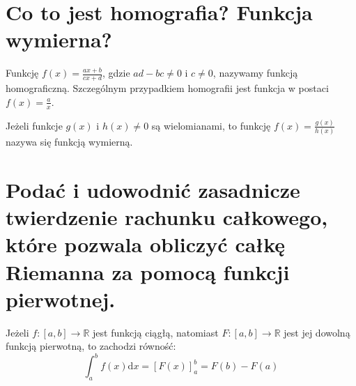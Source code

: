 \documentclass{article}
\numberwithin{equation}{section}
\theoremstyle{definition}
\theoremstyle{case}
\DeclareMathOperator{\tg}{tg}
\DeclareMathOperator{\ctg}{ctg}
\begin{document}
\begin{multicols}{2}
\end{multicols}

\section{Co to jest homografia? Funkcja wymierna?}
Funkcję $f(x) = \frac{ax+b}{cx+d}$, gdzie $ad-bc \neq 0$ i $c \neq 0$, nazywamy funkcją homograficzną. Szczególnym przypadkiem homografii jest funkcja w postaci $f(x) = \frac{a}{x}$.

Jeżeli funkcje $g(x)$ i $h(x) \neq 0$ są wielomianami, to funkcję $f(x)=\frac{g(x)}{h(x)}$ nazywa się funkcją wymierną.

\setcounter{section}{63}
\section{Podać i udowodnić zasadnicze twierdzenie rachunku całkowego,
które pozwala obliczyć całkę Riemanna za pomocą funkcji pierwotnej.}
Jeżeli ${f \colon [a,b] \to \mathbb{R}}$ jest funkcją ciągłą, natomiast ${F \colon [a,b] \to \mathbb{R}}$
jest jej dowolną funkcją pierwotną, to zachodzi równość:
\begin{equation*}
	\int_a^b f(x) \mathrm{d}x = [ F(x) ]_a^b = F(b) - F(a)
\end{equation*}
\end{document}
